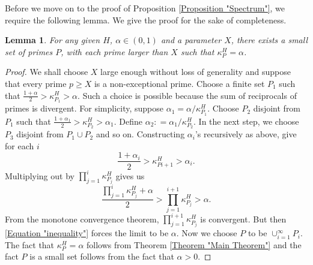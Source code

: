 \documentclass[12pt, a4paper]{amsart}
\newtheorem{lemma}{Lemma}
\theoremstyle{remark}
\theoremstyle{proof}
\numberwithin{equation}{section}
\numberwithin{assumption}{section}
\begin{document}
	Before we move on to the proof of Proposition \ref{Proposition "Spectrum"}, we require the following lemma. We give the proof for the sake of completeness. 
	
	\begin{lemma}\label{Lemma "Spectrum"}
		For any given $H$, $\alpha\in(0,1)$ and a parameter $X$, there exists a small set of primes $P$, with each prime larger than $X$ such that $\kappa_P^H = \alpha$.
	\end{lemma}
	
	\begin{proof}
		We shall choose $X$ large enough without loss of generality and suppose that every prime $p\geqslant X$ is a non-exceptional prime. Choose a finite set $P_1$ such that $\frac{1+\alpha}{2} > \kappa_{P_1}^H > \alpha$. Such a choice is possible because the sum of reciprocals of primes is divergent. For simplicity, suppose $\alpha_1 = \alpha/\kappa_{P_1}^H$. Choose $P_2$ disjoint from $P_1$ such that $\frac{1 + \alpha_1}{2} > \kappa_{P_2}^H > \alpha_1$. Define $\alpha_2 : = \alpha_1/\kappa_{P_2}^H$. In the next step, we choose $P_3$ disjoint from $P_1\cup P_2$ and so on. Constructing $\alpha_i$'s recursively as above, give for each $i$
		\[
		\frac{1 + \alpha_i}{2} > \kappa_{P{i+1}}^H > \alpha_i.
		\]
		Multiplying out by $\prod_{j=1}^{i} \kappa_{P_j}^H$ gives us
		\begin{equation}\label{Equation "inequality"}
			\frac{\prod_{j=1}^{i} \kappa_{P_j}^H + \alpha}{2} > \prod_{j=1}^{i+1} \kappa_{P_j}^H > \alpha.
		\end{equation}
		From the monotone convergence theorem, $\prod_{j=1}^{i+1} \kappa_{P_j}^H $ is convergent. But then \eqref{Equation "inequality"} forces the limit to be $\alpha$. Now we choose $P$ to be $\cup_{i=1}^{\infty} P_i$. The fact that $\kappa_P^H=\alpha$ follows from Theorem \ref{Theorem "Main Theorem"} and the fact $P$ is a small set follows from the fact that $\alpha > 0$. 
	\end{proof}
	
\end{document}
